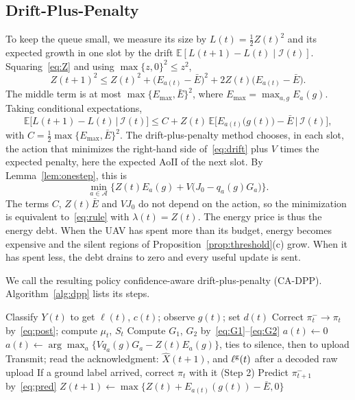 \documentclass[5p,twocolumn]{elsarticle}
\theoremstyle{remark}
\newcommand{\E}{\mathbb{E}}
\newcommand{\A}{\mathcal{A}}
\newcommand{\I}{\mathcal{I}}
\newcommand{\lab}{\ell}
\begin{document}
\subsection{Drift-Plus-Penalty}
To keep the queue small, we measure its size by $L(t)=\frac12Z(t)^2$ and its expected growth in one slot by the drift $\E[L(t+1)-L(t)\mid\I(t)]$. Squaring~\eqref{eq:Z} and using $\max\{z,0\}^2\le z^2$,
\[
Z(t+1)^2\le Z(t)^2+\big(E_{a(t)}-\bar E\big)^2+2Z(t)\big(E_{a(t)}-\bar E\big).
\]
The middle term is at most $\max\{E_{\max},\bar E\}^2$, where $E_{\max}=\max_{a,g}E_a(g)$. Taking conditional expectations,
\begin{equation}\label{eq:drift}
\E\big[L(t+1)-L(t)\,|\,\I(t)\big]\le C+Z(t)\,\E\Big[E_{a(t)}\big(g(t)\big)-\bar E\,\big|\,\I(t)\Big],
\end{equation}
with $C=\frac12\max\{E_{\max},\bar E\}^2$. The drift-plus-penalty method chooses, in each slot, the action that minimizes the right-hand side of~\eqref{eq:drift} plus $V$ times the expected penalty, here the expected AoII of the next slot. By Lemma~\ref{lem:onestep}, this is
\[
\min_{a\in\A}\Big\{Z(t)E_a(g)+V\big(J_0-q_a(g)G_a\big)\Big\}.
\]
The terms $C$, $Z(t)\bar E$ and $VJ_0$ do not depend on the action, so the minimization is equivalent to~\eqref{eq:rule} with $\lambda(t)=Z(t)$. The energy price is thus the energy debt. When the UAV has spent more than its budget, energy becomes expensive and the silent regions of Proposition~\ref{prop:threshold}(c) grow. When it has spent less, the debt drains to zero and every useful update is sent.

We call the resulting policy confidence-aware drift-plus-penalty (CA-DPP). Algorithm~\ref{alg:dpp} lists its steps.

\begin{algorithm}[t]
\caption{CA-DPP, executed by the UAV in slot $t$}\label{alg:dpp}
\begin{algorithmic}[1]
\State Classify $Y(t)$ to get $\lab(t)$, $c(t)$; observe $g(t)$; set $d(t)$
\State Correct $\pi^-_t\to\pi_t$ by~\eqref{eq:post}; compute $\mu_t$, $S_t$
\State Compute $G_1$, $G_2$ by~\eqref{eq:G1}--\eqref{eq:G2}
 $a(t)\gets0$
\Else\ $a(t)\gets\arg\max_a\{Vq_a(g)G_a-Z(t)E_a(g)\}$, ties to silence, then to upload
\EndIf
\State Transmit; read the acknowledgment: $\hat X(t+1)$, and $\lab^{\rm g}(t)$ after a decoded raw upload
\State If a ground label arrived, correct $\pi_t$ with it (Step 2)
\State Predict $\pi^-_{t+1}$ by~\eqref{eq:pred}
\State $Z(t+1)\gets\max\big\{Z(t)+E_{a(t)}(g(t))-\bar E,0\big\}$
\end{algorithmic}
\end{algorithm}
\end{document}
